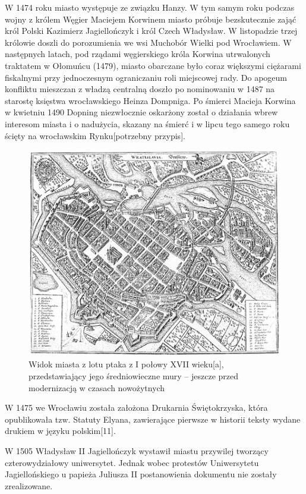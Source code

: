 \documentclass{article}
\begin{document}
W 1474 roku miasto występuje ze związku Hanzy. W tym samym roku podczas wojny z królem Węgier Maciejem Korwinem miasto próbuje bezskutecznie zająć król Polski Kazimierz Jagiellończyk i król Czech Władysław. W listopadzie trzej królowie doszli do porozumienia we wsi Muchobór Wielki pod Wrocławiem. W następnych latach, pod rządami węgierskiego króla Korwina utrwalonych traktatem w Ołomuńcu (1479), miasto obarczane było coraz większymi ciężarami fiskalnymi przy jednoczesnym ograniczaniu roli miejscowej rady. Do apogeum konfliktu mieszczan z władzą centralną doszło po nominowaniu w 1487 na starostę księstwa wrocławskiego Heinza Dompniga. Po śmierci Macieja Korwina w kwietniu 1490 Dopning niezwłocznie oskarżony został o działania wbrew interesom miasta i o nadużycia, skazany na śmierć i w lipcu tego samego roku ścięty na wrocławskim Rynku[potrzebny przypis].
 \begin{figure}[h!]
\centering
\includegraphics[scale=1]{4.jpg}
\caption{Widok miasta z lotu ptaka z I połowy XVII wieku[a], przedstawiający jego średniowieczne mury – jeszcze przed modernizacją w czasach nowożytnych}
\end{figure}

W 1475 we Wrocławiu została założona Drukarnia Świętokrzyska, która opublikowała tzw. Statuty Elyana, zawierające pierwsze w historii teksty wydane drukiem w języku polskim[11].

W 1505 Władysław II Jagiellończyk wystawił miastu przywilej tworzący czterowydziałowy uniwersytet. Jednak wobec protestów Uniwersytetu Jagiellońskiego u papieża Juliusza II postanowienia dokumentu nie zostały zrealizowane.
\end{document}

